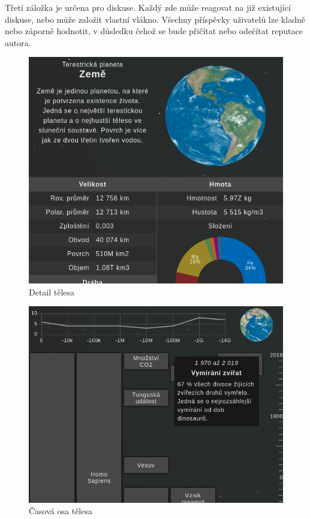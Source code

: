 \documentclass[a4paper,12pt]{article}
\begin{document}
Třetí záložka je určena pro diskuse. Každý zde může reagovat na již existující diskuse, nebo může založit vlastní vlákno. Všechny příspěvky uživatelů lze kladně nebo záporně hodnotit, v důsledku čehož se bude přičítat nebo odečítat reputace autora.

\begin{figure}[H]
\begin{center}
\includegraphics[width=350pt]{Images/Body.png}
\caption{Detail tělesa}
\label{BodiesList}
\end{center}
\end{figure}

\begin{figure}[H]
\begin{center}
\includegraphics[width=350pt]{Images/Timeline.png}
\caption{Časová osa tělesa}
\label{BodiesList}
\end{center}
\end{figure}
\end{document}
